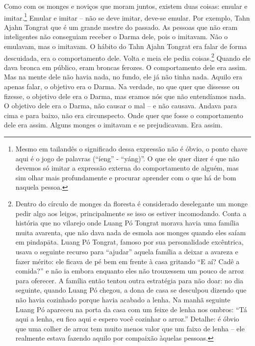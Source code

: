 Como com os monges e noviços que moram juntos, existem duas coisas:
emular e imitar.\footnote{Mesmo em tailandês o significado dessa
expressão não é óbvio, o ponto chave aqui é o jogo de palavras
(“íeng” - “yáng)”. O que ele quer dizer é que não devemos só imitar a
expressão externa do comportamento de alguém, mas sim olhar mais
profundamente e procurar aprender com o que há de bom naquela pessoa.}
Emular e imitar – não se deve imitar, deve-se emular. Por exemplo, Tahn
Ajahn Tongrat que é um grande mestre do passado. As pessoas que não
eram inteligentes não conseguiam receber o Darma dele, pois o imitavam.
Não o emulavam, mas o imitavam. O hábito do Tahn Ajahn Tongrat era
falar de forma descuidada, era o comportamento dele. Volta e meia ele
pedia coisas.\footnote{Dentro do círculo de monges da floresta é
considerado deselegante um monge pedir algo aos leigos, principalmente
se isso os estiver incomodando. Conta a história que no vilarejo onde
Luang Pó Tongrat morava havia uma família muita avarenta, que não dava
nada de esmola aos monges quando eles saíam em pindapāta. Luang Pó
Tongrat, famoso por sua personalidade excêntrica, usava o seguinte
recurso para “ajudar” aquela família a deixar a avareza e fazer mérito:
ele ficava de pé bem em frente à casa gritando “E aí? Cadê a comida?” e
não ia embora enquanto eles não trouxessem um pouco de arroz para
oferecer. A família então tentou outra estratégia para não doar: no dia
seguinte, quando Luang Pó chegou, a dona de casa se desculpou dizendo
que não havia cozinhado porque havia acabado a lenha. Na manhã seguinte
Luang Pó apareceu na porta da casa com um feixe de lenha nos ombros:
“Tá aqui a lenha, eu fico aqui e espero você cozinhar o arroz.”
Detalhe: é óbvio que uma colher de arroz tem muito menos valor que um
faixo de lenha – ele realmente estava fazendo aquilo por compaixão
àquelas pessoas.} Quando ele dava bronca em público, eram broncas
ferozes. O comportamento dele era assim. Mas na mente dele não havia
nada, no fundo, ele já não tinha nada. Aquilo era apenas falar, o
objetivo era o Darma. Na verdade, no que quer que dissesse ou fizesse,
o objetivo dele era o Darma, mas eramos nós que não entendíamos nada. O
objetivo dele era o Darma, não causar o mal – e não causava. Andava
para cima e para baixo, não era circunspecto. Onde quer que fosse o
comportamento dele era assim. Alguns monges o imitavam e se
prejudicavam. Era assim.

